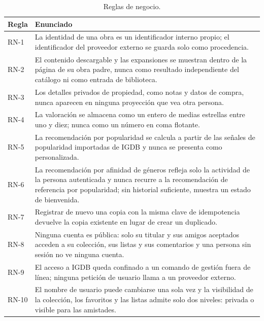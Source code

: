 \begin{table}[H]
\centering
\begin{tabularx}{\textwidth}{ | C{0.12\textwidth} | Y | }
    \hline
    \textbf{Regla} & \textbf{Enunciado} \\
    \hline
    RN-1 & La identidad de una obra es un identificador interno propio; el identificador del proveedor externo se guarda solo como procedencia. \\
    \hline
    RN-2 & El contenido descargable y las expansiones se muestran dentro de la página de su obra padre, nunca como resultado independiente del catálogo ni como entrada de biblioteca. \\
    \hline
    RN-3 & Los detalles privados de propiedad, como notas y datos de compra, nunca aparecen en ninguna proyección que vea otra persona. \\
    \hline
    RN-4 & La valoración se almacena como un entero de medias estrellas entre uno y diez; nunca como un número en coma flotante. \\
    \hline
    RN-5 & La recomendación por popularidad se calcula a partir de las señales de popularidad importadas de IGDB y nunca se presenta como personalizada. \\
    \hline
    RN-6 & La recomendación por afinidad de géneros refleja solo la actividad de la persona autenticada y nunca recurre a la recomendación de referencia por popularidad; sin historial suficiente, muestra un estado de bienvenida. \\
    \hline
    RN-7 & Registrar de nuevo una copia con la misma clave de idempotencia devuelve la copia existente en lugar de crear un duplicado. \\
    \hline
    RN-8 & Ninguna cuenta es pública: solo su titular y sus amigos aceptados acceden a su colección, sus listas y sus comentarios y una persona sin sesión no ve ninguna cuenta. \\
    \hline
    RN-9 & El acceso a IGDB queda confinado a un comando de gestión fuera de línea; ninguna petición de usuario llama a un proveedor externo. \\
    \hline
    RN-10 & El nombre de usuario puede cambiarse una sola vez y la visibilidad de la colección, los favoritos y las listas admite solo dos niveles: privada o visible para las amistades. \\
    \hline
\end{tabularx}
\caption{Reglas de negocio.}
\label{tab:reglas-negocio}
\end{table}

